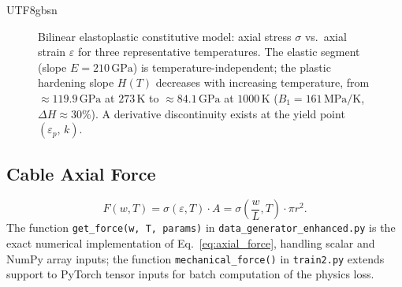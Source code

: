 \documentclass[a4paper,12pt]{report}
\begin{document}
\begin{CJK}{UTF8}{gbsn}
\begin{figure}[H]
  \caption{Bilinear elastoplastic constitutive model: axial stress $\sigma$ vs.\ axial
    strain $\varepsilon$ for three representative temperatures.  The elastic segment
    (slope $E = 210\,\mathrm{GPa}$) is temperature-independent; the plastic hardening
    slope $H(T)$ decreases with increasing temperature, from $\approx 119.9\,\mathrm{GPa}$
    at $273\,\mathrm{K}$ to $\approx 84.1\,\mathrm{GPa}$ at $1000\,\mathrm{K}$
    ($B_1 = 161\,\mathrm{MPa/K}$, $\Delta H \approx 30\%$).  A
    derivative discontinuity exists at the yield point $(\varepsilon_p,\,k)$.}
  \label{fig:constitutive_curve}
\end{figure}

\subsection{Cable Axial Force}
\label{subsec:axial_force}

\begin{equation}
  F(w, T) = \sigma(\varepsilon, T) \cdot A = \sigma\!\left(\frac{w}{L}, T\right) \cdot \pi r^2.
  \label{eq:axial_force}
\end{equation}
The function \texttt{get\_force(w, T, params)} in \texttt{data\_generator\_enhanced.py}
is the exact numerical implementation of Eq.~\eqref{eq:axial_force}, handling scalar
and NumPy array inputs; the function \texttt{mechanical\_force()} in \texttt{train2.py}
extends support to PyTorch tensor inputs for batch computation of the physics loss.



\end{CJK}
\end{document}
